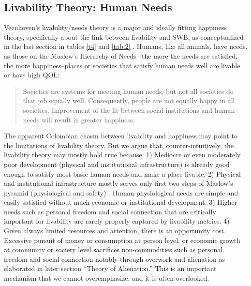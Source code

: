 \documentclass[10pt, letterpaper]{article}
\begin{document}
\begin{spacing}{2}
\subsection{%
  Livability Theory: Human Needs}


Veenhoven's livability/needs theory is a major and ideally
fitting happiness theory, specifically about the link between
livability and SWB, as conceptualized in the last section in tables \ref{t4} and
\ref{tab:2} \citep{veenhoven95,veenhoven14b}. Humans, like all animals, have needs, as those
on the Maslow's Hierarchy of Needs \citep{maslow87}--the more the needs are
satisfied, the more happiness--places or societies that satisfy human needs well
are livable or have high QOL: 

\begin{quote}
  Societies are systems for meeting human needs, but not all societies do that
  job equally well. Consequently, people are not equally happy in all
  societies. Improvement of the fit between social institutions and human needs will result
  in greater happiness. \citep[p. 3645][]{veenhoven14b}
\end{quote}


The apparent Colombian chasm between livability and happiness may point to the
limitations of livability theory.
 But we argue that, counter-intuitively, the livability theory may mostly hold
 true  because:
 1) Mediocre or even moderately poor development (physical and
 institutional infrastructure) is already good enough to satisfy most basic human
 needs and make a place livable;
 2) %
  Physical and institutional infrastructure mostly serves only first two steps of
  Maslow's pyramid (physiological and safety) \citep{maslow87}. {Human physiological needs are simple
   and easily satisfied without much economic or institutional development.}
  3) Higher needs such as personal
  freedom and social connection that are critically important for
  livability are rarely properly captured by livability metrics.
  4) Given always limited resources and attention, %
  there is an opportunity cost. 
  Excessive pursuit of money or consumption at person level, or economic growth
  at community or society level sacrifices non-commodities such as personal freedom and social connection
  notably through overwork and alienation {as elaborated in later
    section ``Theory of Alienation.''} This is an important mechanism that we cannot overemphasize,
and it is often overlooked.    


\end{spacing}
\end{document}
